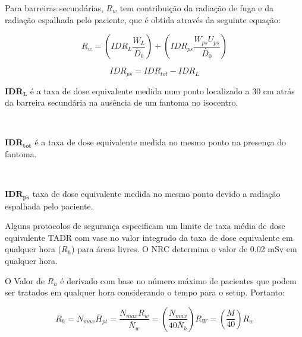 \documentclass[11pt,a4paper]{article}
\newcounter{exemplo}
\begin{document}
        Para barreiras secundárias, $R_w$ tem contribuição da radiação de fuga e da radiação espalhada pelo paciente, que é obtida através da seguinte equação:

        \begin{equation}
            R_w = \left(IDR_L \frac{W_L}{\dot{D_0}}\right) + \left(IDR_{ps} \frac{W_{ps} U_{ps}}{\dot{D_0}}\right)
        \end{equation}

        \begin{equation}
            IDR_{ps} = IDR_{tot} - IDR_{L}
        \end{equation}

        \begin{exemplo}[onde:]
            \textcolor{CarnationPink}{$\mathbf{IDR_L}$} é a taxa de dose equivalente medida num ponto localizado a 30 cm atrás da barreira secundária na ausência de um fantoma no isocentro.

            \

            \textcolor{CarnationPink}{$\mathbf{IDR_{tot}}$} é a taxa de dose equivalente medida no mesmo ponto na presença do fantoma.

            \

            \textcolor{CarnationPink}{$\mathbf{IDR_{ps}}$} taxa de dose equivalente medida no mesmo ponto devido a radiação espalhada pelo paciente.

        \end{exemplo}


        Alguns protocolos de segurança especificam um limite de taxa média de dose equivalente TADR com vase no valor integrado da taxa de dose equivalente em qualquer hora ($R_h$) para áreas livres. O NRC determina o valor de 0.02 mSv em qualquer hora. 

        O Valor de $R_h$ é derivado com base no número máximo de pacientes que podem ser tratados em qualquer hora considerando o tempo para o setup. Portanto:

        \begin{equation}
            R_h = N_{max} \bar{H}_{pt} = \frac{N_{max} R_w}{\bar{N}_w}
            = \left(\frac{N_{max}}{40 \bar{N}_h}\right)R_W
            = \left(\frac{M}{40}\right)R_w
        \end{equation}





\end{document}
